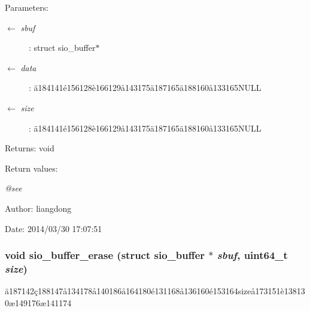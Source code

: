 \begin{Desc}
\item[Parameters:]
\begin{description}
\item[\mbox{$\leftarrow$} {\em sbuf}]: struct sio\_\-buffer$\ast$ \item[\mbox{$\leftarrow$} {\em data}]: \"{a}184141\'{e}156128\`{e}166129\aa{}143175\"{a}187165\"{a}188160\aa{}133165NULL \item[\mbox{$\leftarrow$} {\em size}]: \"{a}184141\'{e}156128\`{e}166129\aa{}143175\"{a}187165\"{a}188160\aa{}133165NULL \end{description}
\end{Desc}
\begin{Desc}
\item[Returns:]void \end{Desc}
\begin{Desc}
\item[Return values:]
\begin{description}
\item[{\em @see}]\end{description}
\end{Desc}
\begin{Desc}
\item[Author:]liangdong \end{Desc}
\begin{Desc}
\item[Date:]2014/03/30 17:07:51 \end{Desc}
\subsubsection{\setlength{\rightskip}{0pt plus 5cm}void sio\_\-buffer\_\-erase (struct sio\_\-buffer $\ast$ {\em sbuf}, uint64\_\-t {\em size})}\label{sio__buffer_8h_a4}


\"{a}187142\c{c}188147\aa{}134178\aa{}140186\aa{}164180\'{e}131168\aa{}136160\'{e}153164size\aa{}173151\`{e}138130\ae{}149176\ae{}141174 

